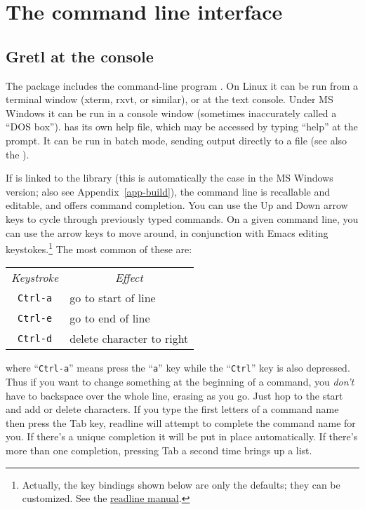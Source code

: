 \chapter{The command line interface}
\label{cli}

\section{Gretl at the console}
\label{cli-console}

The  package includes the command-line program
.  On Linux it can be run from a terminal window (xterm,
rxvt, or similar), or at the text console.  Under MS Windows it can be
run in a console window (sometimes inaccurately called a ``DOS box'').
 has its own help file, which may be accessed by typing
``help'' at the prompt. It can be run in batch mode, sending output
directly to a file (see also the \GCR).
    
If  is linked to the  library (this is
automatically the case in the MS Windows version; also see
Appendix~\ref{app-build}), the command line is recallable and
editable, and offers command completion.  You can use the Up and Down
arrow keys to cycle through previously typed commands.  On a given
command line, you can use the arrow keys to move around, in
conjunction with Emacs editing keystokes.\footnote{Actually, the key
  bindings shown below are only the defaults; they can be customized.
  See the
  \href{http://cnswww.cns.cwru.edu/~chet/readline/readline.html}{readline
    manual}.} The most common of these are:
%    
\begin{center}
  \begin{tabular}{cl}
    \textit{Keystroke} & \multicolumn{1}{c}{\textit{Effect}}\\
    \verb+Ctrl-a+ & go to start of line\\
    \verb+Ctrl-e+ & go to end of line\\
    \verb+Ctrl-d+ & delete character to right\\
  \end{tabular}
\end{center}
%
where ``\verb+Ctrl-a+'' means press the ``\verb+a+'' key while the
``\verb+Ctrl+'' key is also depressed.  Thus if you want to change
something at the beginning of a command, you \emph{don't} have to
backspace over the whole line, erasing as you go.  Just hop to the
start and add or delete characters.  If you type the first letters of
a command name then press the Tab key, readline will attempt to
complete the command name for you.  If there's a unique completion it
will be put in place automatically.  If there's more than one
completion, pressing Tab a second time brings up a list.

